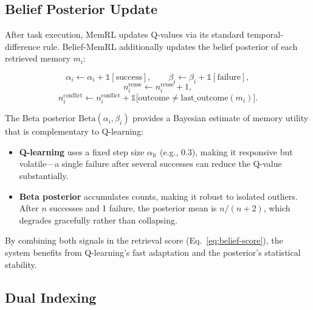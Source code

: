 \subsection{Belief Posterior Update}
\label{sec:belief-update}

After task execution, MemRL updates Q-values via its standard temporal-difference rule. Belief-MemRL additionally updates the belief posterior of each retrieved memory $m_i$:

\begin{equation}
\label{eq:belief-update}
  \alpha_i \leftarrow \alpha_i + \mathbb{1}[\text{success}], \qquad
  \beta_i  \leftarrow \beta_i  + \mathbb{1}[\text{failure}],
\end{equation}
\begin{equation}
  n_i^{\mathrm{reuse}} \leftarrow n_i^{\mathrm{reuse}} + 1,
\end{equation}
\begin{equation}
  n_i^{\mathrm{conflict}} \leftarrow n_i^{\mathrm{conflict}} + \mathbb{1}\!\bigl[\text{outcome} \neq \text{last\_outcome}(m_i)\bigr].
\end{equation}

The Beta posterior $\mathrm{Beta}(\alpha_i, \beta_i)$ provides a Bayesian estimate of memory utility that is complementary to Q-learning:

\begin{itemize}
  \item \textbf{Q-learning} uses a fixed step size $\alpha_{\mathrm{lr}}$ (e.g., 0.3), making it responsive but volatile---a single failure after several successes can reduce the Q-value substantially.
  \item \textbf{Beta posterior} accumulates counts, making it robust to isolated outliers. After $n$ successes and 1 failure, the posterior mean is $n/(n+2)$, which degrades gracefully rather than collapsing.
\end{itemize}

By combining both signals in the retrieval score (Eq.~\ref{eq:belief-score}), the system benefits from Q-learning's fast adaptation and the posterior's statistical stability.

\subsection{Dual Indexing}
\label{sec:dual-index}

